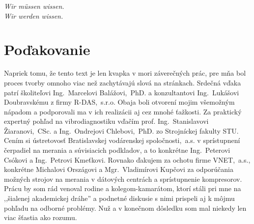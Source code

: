 \thispagestyle{empty}
\vspace*{\fill}

\begin{center}
\settowidth{}
\parbox{\longest}{
  \hrulefill\hspace{0.2cm} \decofourleft\decofourright \hspace{0.2cm} \hrulefill\par
  \raggedright{
  \itshape
  	Wir müssen wissen. \\ Wir werden wissen.\par
  }   
  \par
  \hrulefill\hspace{0.2cm} \decofourleft\decofourright\hspace{0.2cm} \hrulefill\par
}
\end{center}

\vspace*{\fill}
\section*{Poďakovanie}
{\linespread{1.0}\small Napriek tomu, že tento text je len kvapka v mori záverečných prác, pre mňa bol proces tvorby omnoho viac než zachytávajú slová na stránkach. Srdečná vďaka patrí školiteľovi Ing.~Marcelovi Balážovi,~PhD. a konzultantovi Ing.~Lukášovi Doubravskému z firmy R-DAS,~s.r.o. Obaja boli otvorení mojim všemožným nápadom a podporovali ma v ich realizácii aj cez mnohé ťažkosti. Za praktický expertný pohľad na vibrodiagnostiku vďačím prof. Ing.~Stanislavovi Žiaranovi,~CSc. a Ing.~Ondrejovi Chlebovi,~PhD. zo Strojníckej fakulty STU. Cením si ústretovosť Bratislavskej vodárenskej spoločnosti,~a.s. v sprístupnení čerpadiel na merania a súvisiacich podkladov, a to konkrétne Ing.~Peterovi Csókovi a Ing.~Petrovi Kmeťkovi. Rovnako ďakujem za ochotu firme VNET,~a.s., konkrétne Michalovi Országovi a Mgr.~Vladimírovi Kupčovi za odporúčania možných strojov na merania v dátových centrách a sprístupnenie kompresorov. Prácu by som rád venoval rodine a kolegom-kamarátom, ktorí stáli pri mne na ,,šialenej akademickej dráhe'' a podnetné diskusie s nimi prispeli aj k môjmu pohľadu na odborné problémy. Nuž a v konečnom dôsledku som mal niekedy len viac šťastia ako rozumu.}
\vspace{3cm}